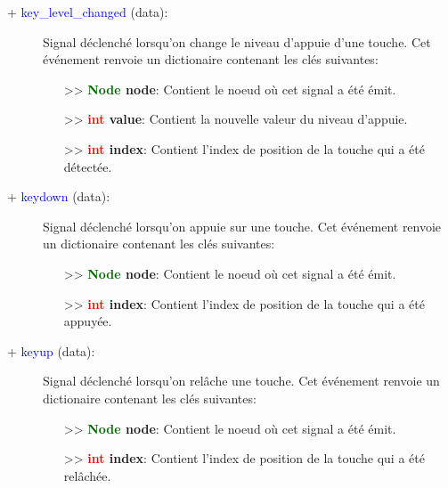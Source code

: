 \documentclass[a4paper, 11pt]{article}
\begin{document}
	\begin{description}
		\item [+ \textcolor{blue}{key\_level\_changed} (data):] Signal déclenché lorsqu'on change le niveau 
		d'appuie d'une touche. Cet événement renvoie un dictionaire contenant les clés suivantes:
		\begin{itemize}
			\item [>> \textbf{\textcolor{darkgreen}{Node} node}:] Contient le noeud où cet signal a été 
			émit.
			\item [>> \textbf{\textcolor{red}{int} value}:] Contient la nouvelle valeur du niveau d'appuie.
			\item [>> \textbf{\textcolor{red}{int} index}:] Contient l'index de position de la touche qui a 
			été détectée.\\
		\end{itemize}
	\end{description}
	\begin{description}
		\item [+ \textcolor{blue}{keydown} (data):] Signal déclenché lorsqu'on appuie sur une touche. Cet 
		événement renvoie un dictionaire contenant les clés suivantes:
		\begin{itemize}
			\item [>> \textbf{\textcolor{darkgreen}{Node} node}:] Contient le noeud où cet signal a été 
			émit.
			\item [>> \textbf{\textcolor{red}{int} index}:] Contient l'index de position de la touche qui a 
			été appuyée.\\
		\end{itemize}
	\end{description}
	\begin{description}
		\item [+ \textcolor{blue}{keyup} (data):] Signal déclenché lorsqu'on relâche une touche. Cet 
		événement renvoie un \\dictionaire contenant les clés suivantes:
		\begin{itemize}
			\item [>> \textbf{\textcolor{darkgreen}{Node} node}:] Contient le noeud où cet signal a été 
			émit.
			\item [>> \textbf{\textcolor{red}{int} index}:] Contient l'index de position de la touche qui a 
			été relâchée.\\
		\end{itemize}
	\end{description}
\end{document}
